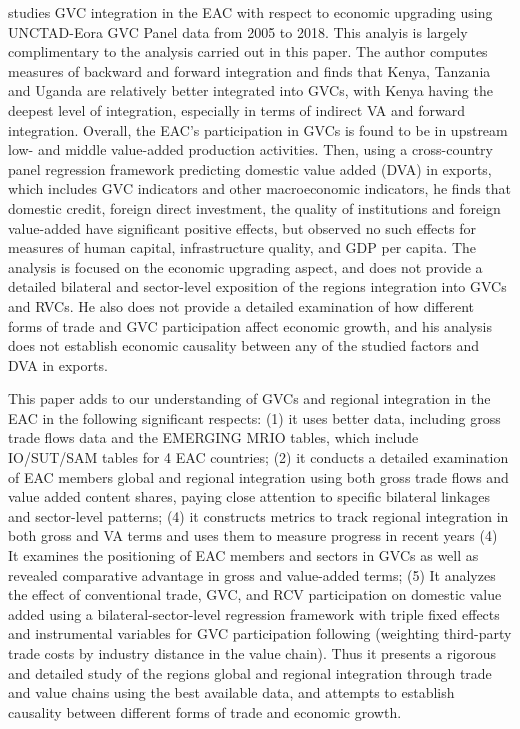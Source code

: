 \documentclass[a4paper]{article}
\begin{document}
\citet{lwesya2022integration} studies GVC integration in the EAC with respect to economic upgrading using UNCTAD-Eora GVC Panel data from 2005 to 2018. This analyis is largely complimentary to the analysis carried out in this paper. The author computes measures of backward and forward integration and finds that Kenya, Tanzania and Uganda are relatively better integrated into GVCs, with Kenya having the deepest level of integration, especially in terms of indirect VA and forward integration. Overall, the EAC's participation in GVCs is found to be in upstream low- and middle value-added production activities. Then, using a cross-country panel regression framework predicting domestic value added (DVA) in exports, which includes GVC indicators and other macroeconomic indicators, he finds that domestic credit, foreign direct investment, the quality of institutions and foreign value-added have significant positive effects, but observed no such effects for measures of human capital, infrastructure quality, and GDP per capita. The analysis is focused on the economic upgrading aspect, and does not provide a detailed bilateral and sector-level exposition of the regions integration into GVCs and RVCs. He also does not provide a detailed examination of how different forms of trade and GVC participation affect economic growth, and his analysis does not establish economic causality between any of the studied factors and DVA in exports. \newline

This paper adds to our understanding of GVCs and regional integration in the EAC in the following significant respects: (1) it uses better data, including gross trade flows data and the EMERGING MRIO tables, which include IO/SUT/SAM tables for 4 EAC countries; (2) it conducts a detailed examination of EAC members global and regional integration using both gross trade flows and value added content shares, paying close attention to specific bilateral linkages and sector-level patterns; (4) it constructs metrics to track regional integration in both gross and VA terms and uses them to measure progress in recent years (4) It examines the positioning of EAC members and sectors in GVCs as well as revealed comparative advantage in gross and value-added terms; (5) It analyzes the effect of conventional trade, GVC, and RCV participation on domestic value added using a bilateral-sector-level regression framework with triple fixed effects and instrumental variables for GVC participation following \citet{Kummritz20161} (weighting third-party trade costs by industry distance in the value chain). Thus it presents a rigorous and detailed study of the regions global and regional integration through trade and value chains using the best available data, and attempts to establish causality between different forms of trade and economic growth. 
\end{document}
